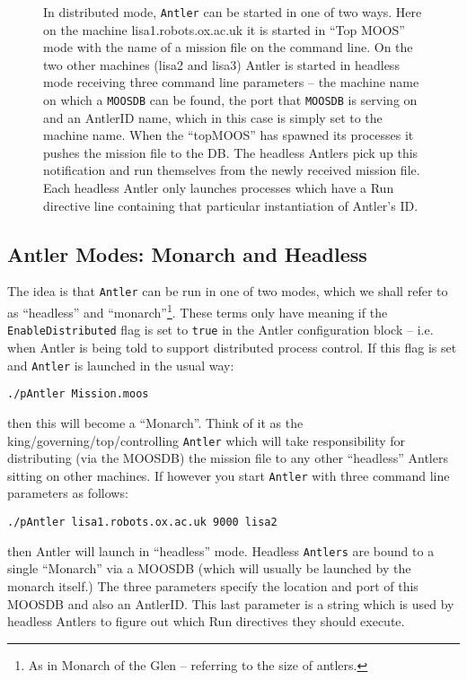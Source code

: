 \documentclass[a4paper,10pt]{article}
\newcommand{\Code}[1]{\texttt{#1} }
\newcommand{\code}[1]{\Code{#1} }
\begin{document}
\begin{figure}\label{Fig:Distributed}
\centering
{}
\caption{In distributed mode, \code{Antler} can be started in one of two ways. Here on the machine lisa1.robots.ox.ac.uk it is started  in ``Top MOOS'' mode with the name of a mission file on the command line. On the two other machines (lisa2 and lisa3) Antler is started in headless mode receiving three command line parameters -- the machine name on which a \code{MOOSDB} can be found, the port that \code{MOOSDB} is serving on and an AntlerID name, which in this case is simply set to the machine name. When the ``topMOOS'' has spawned its processes it pushes the mission file to the DB. The headless Antlers pick up this notification and run themselves from the newly received mission file. Each headless Antler  only launches processes which have a Run directive line containing that particular instantiation of Antler's ID.}
\end{figure}

\subsection{Antler Modes: Monarch and Headless}

The idea is that \code{Antler} can be run in one of two modes, which we shall refer to as ``headless'' and ``monarch''\footnote{As in Monarch of the Glen -- referring to the size of antlers.}. These terms only have meaning if the \code{EnableDistributed} flag is set to \code{true} in the Antler configuration block -- i.e. when Antler is being told to support distributed process control. If this flag is set and \code{Antler} is launched in the usual way:

\begin{lstlisting}
./pAntler Mission.moos
\end{lstlisting}

then this will become a ``Monarch''. Think of it as the king/governing/top/controlling \code{Antler} which will take responsibility for distributing (via the MOOSDB) the mission file to any other ``headless'' Antlers sitting on other machines.  If however you start \code{Antler} with three command line parameters as follows:

\begin{lstlisting}
./pAntler lisa1.robots.ox.ac.uk 9000 lisa2
\end{lstlisting}

then Antler will launch in ``headless'' mode. Headless \code{Antlers} are bound to a single ``Monarch'' via a MOOSDB (which will usually be launched by the monarch itself.) The three parameters specify the location and port of this MOOSDB and also an AntlerID. This last parameter is a string which is used by headless Antlers to figure out which Run directives they should execute.
\end{document}
